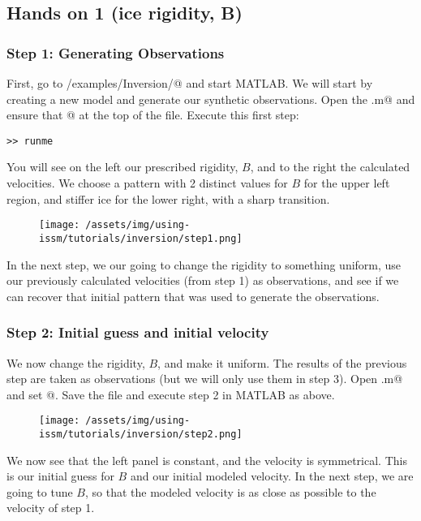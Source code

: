 \subsection{Hands on 1 (ice rigidity, B)} %
\subsubsection{Step 1: Generating Observations}
First, go to \verb@trunk/examples/Inversion/@ and start MATLAB. We will start by creating a new model and generate our synthetic observations.  Open the \verb@runme.m@ and ensure that @ at the top of the file. Execute this first step:
\begin{verbatim}>> runme\end{verbatim}
You will see on the left our prescribed rigidity, $B$, and to the right the calculated velocities. We choose a pattern with 2 distinct values for $B$ for the upper left region, and stiffer ice for the lower right, with a sharp transition.
\begin{figure}[H]
	\begin{center}
		\texttt{[image: /assets/img/using-issm/tutorials/inversion/step1.png]}
	\end{center}
\end{figure}
In the next step, we our going to change the rigidity to something uniform, use our previously calculated velocities (from step 1) as observations, and see if we can recover that initial pattern that was used to generate the observations.

\subsubsection{Step 2: Initial guess and initial velocity}
We now change the rigidity, $B$, and make it uniform. The results of the previous step are taken as observations (but we will only use them in step 3). Open \verb@runme.m@ and set @. Save the file and execute step 2 in MATLAB as above.
\begin{figure}[H]
	\begin{center}
		\texttt{[image: /assets/img/using-issm/tutorials/inversion/step2.png]}
	\end{center}
\end{figure}
We now see that the left panel is constant, and the velocity is symmetrical. This is our initial guess for $B$ and our initial modeled velocity. In the next step, we are going to tune $B$, so that the modeled velocity is as close as possible to the velocity of step 1.

